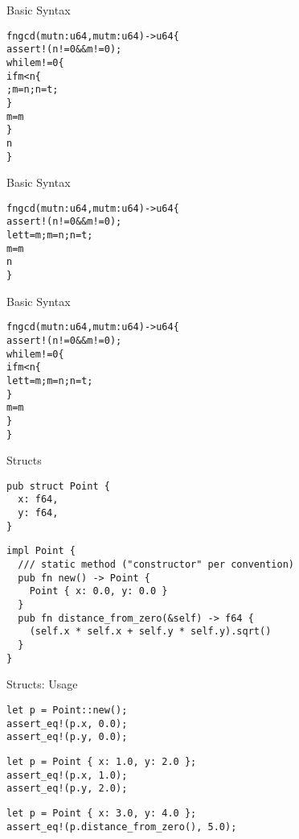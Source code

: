 
\begin{frame}[fragile]{Basic Syntax}
\begin{alltt}
fn gcd(mut n: u64, mut m: u64) -> u64 \{
    assert!(n != 0 && m != 0);
    while m != 0 \{
        if m < n \{
            ; m = n; n = t;
        \}
        m = m % n;
    \}
    n
\}
\end{alltt}
\end{frame}


\begin{frame}[fragile]{Basic Syntax}
\begin{alltt}
fn gcd(mut n: u64, mut m: u64) -> u64 \{
    assert!(n != 0 && m != 0);
            let t = m; m = n; n = t;
        \hi{\}}
        m = m % n;
    \hi{\}}
    n
\}
\end{alltt}
\end{frame}


\begin{frame}[fragile]{Basic Syntax}
\begin{alltt}
fn gcd(mut n: u64, mut m: u64) -> u64 \{
    assert!(n != 0 && m != 0);
    while m != 0 \{
        if m < n \{
            let t = m; m = n; n = t;
        \}
        m = m % n;
    \}
\}
\end{alltt}
\end{frame}


\begin{frame}[fragile]{Structs}
\begin{verbatim}
pub struct Point {
  x: f64,
  y: f64,
}
\end{verbatim}
\pause
\begin{verbatim}
impl Point {
  /// static method ("constructor" per convention)
  pub fn new() -> Point {
    Point { x: 0.0, y: 0.0 }
  }
  pub fn distance_from_zero(&self) -> f64 {
    (self.x * self.x + self.y * self.y).sqrt()
  }
}
\end{verbatim}
\end{frame}

\begin{frame}[fragile]{Structs: Usage}
\begin{verbatim}
let p = Point::new();
assert_eq!(p.x, 0.0);
assert_eq!(p.y, 0.0);
\end{verbatim}
\begin{verbatim}
let p = Point { x: 1.0, y: 2.0 };
assert_eq!(p.x, 1.0);
assert_eq!(p.y, 2.0);
\end{verbatim}
\begin{verbatim}
let p = Point { x: 3.0, y: 4.0 };
assert_eq!(p.distance_from_zero(), 5.0);
\end{verbatim}
\end{frame}

